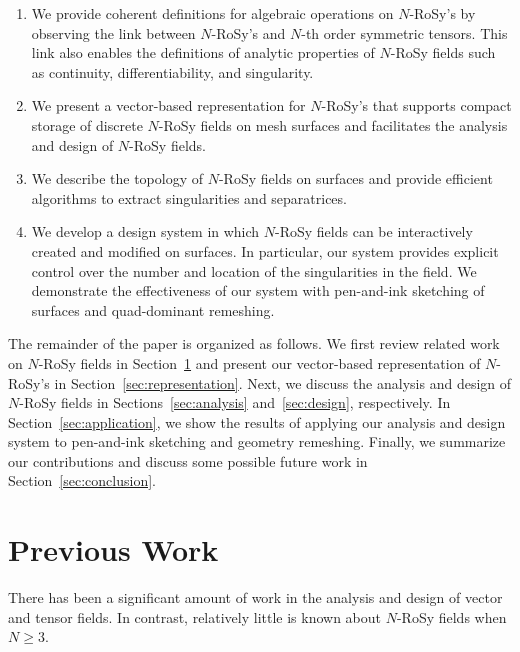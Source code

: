 \documentclass{acmsiggraph}               %
\begin{document}
\begin{enumerate}
\item We provide coherent definitions for algebraic
operations on $N$-RoSy's by observing the link between $N$-RoSy's
and $N$-th order symmetric tensors. This link also enables the
definitions of analytic properties of $N$-RoSy fields such as
continuity, differentiability, and singularity.
\item We present a vector-based representation for $N$-RoSy's that
supports compact storage of discrete $N$-RoSy fields on mesh
surfaces and facilitates the analysis and design of $N$-RoSy fields.
\item We describe the topology of $N$-RoSy fields on surfaces
and provide efficient algorithms to extract singularities and
separatrices.
\item We develop a design system in which $N$-RoSy fields
can be interactively created and modified on surfaces. In
particular, our system provides explicit control over the number and
location of the singularities in the field. We demonstrate the
effectiveness of our system with pen-and-ink sketching of surfaces
and quad-dominant remeshing.
\end{enumerate}

The remainder of the paper is organized as follows. We first review
related work on $N$-RoSy fields in Section~\ref{sec:previous_work}
and present our vector-based representation of $N$-RoSy's in
Section~\ref{sec:representation}. Next, we discuss the analysis and
design of $N$-RoSy fields in Sections~\ref{sec:analysis}
and~\ref{sec:design}, respectively. In
Section~\ref{sec:application}, we show the results of applying our
analysis and design system to pen-and-ink sketching and geometry
remeshing. Finally, we summarize our contributions and discuss some
possible future work in Section~\ref{sec:conclusion}.

\section{Previous Work}
\label{sec:previous_work}

There has been a significant amount of work in the analysis and
design of vector and tensor fields. In contrast, relatively little
is known about $N$-RoSy fields when $N \ge 3$.
\end{document}
